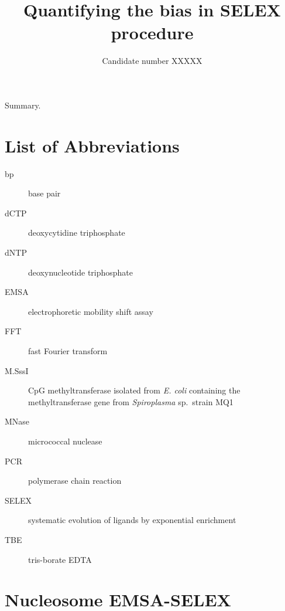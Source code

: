 \documentclass[parskip=full, numbers=noenddot]{scrbook}
\title{Quantifying the bias in SELEX procedure}
\author{Candidate number XXXXX}
\newenvironment{abstract}%
{\cleardoublepage\null \vfill\begin{center}%
    \bfseries \abstractname \end{center}}%
    {\vfill \null}
\begin{document}

\frontmatter

\maketitle

\begin{abstract}
  
Summary.
 
\end{abstract}

\tableofcontents

\chapter*{List of Abbreviations}
\label{ch:abbrev}

\begin{description}
\item [bp] base pair
\item [dCTP] deoxycytidine triphosphate
\item [dNTP] deoxynucleotide triphosphate
\item [EMSA] electrophoretic mobility shift assay
\item [FFT] fast Fourier transform
\item [M.SssI] CpG methyltransferase isolated from \emph{E. coli} containing the methyltransferase gene from \emph{Spiroplasma} sp.\ strain MQ1
\item [MNase] micrococcal nuclease
\item [PCR] polymerase chain reaction
\item [SELEX] systematic evolution of ligands by exponential enrichment
\item [TBE] tris-borate EDTA
\end{description}

\mainmatter

\chapter{Nucleosome EMSA-SELEX}
\label{ch:emsaselex}
\end{document}
